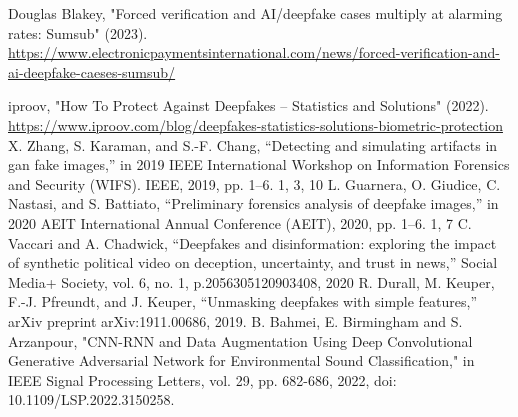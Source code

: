 \begin{thebibliography}{99}
    
     Douglas Blakey, "Forced verification and AI/deepfake cases multiply at alarming rates: Sumsub" (2023). \url{https://www.electronicpaymentsinternational.com/news/forced-verification-and-ai-deepfake-caeses-sumsub/}

    
     iproov, "How To Protect Against Deepfakes – Statistics and Solutions" (2022). \url{https://www.iproov.com/blog/deepfakes-statistics-solutions-biometric-protection}
     X. Zhang, S. Karaman, and S.-F. Chang, “Detecting and simulating artifacts in gan fake images,” in 2019 IEEE International Workshop on Information Forensics and Security (WIFS). IEEE, 2019, pp. 1–6. 1, 3, 10
      L. Guarnera, O. Giudice, C. Nastasi, and S. Battiato, “Preliminary forensics analysis of deepfake images,” in 2020 AEIT International Annual Conference (AEIT), 2020, pp. 1–6. 1, 7
     C. Vaccari and A. Chadwick, “Deepfakes and disinformation: exploring the impact of synthetic political video on deception, uncertainty, and trust in news,” Social Media+ Society, vol. 6, no. 1, p.2056305120903408, 2020
    R. Durall, M. Keuper, F.-J. Pfreundt, and J. Keuper, “Unmasking deepfakes with simple features,” arXiv preprint arXiv:1911.00686, 2019.
    B. Bahmei, E. Birmingham and S. Arzanpour, "CNN-RNN and Data Augmentation Using Deep Convolutional Generative Adversarial Network for Environmental Sound Classification," in IEEE Signal Processing Letters, vol. 29, pp. 682-686, 2022, doi: 10.1109/LSP.2022.3150258.


\end{thebibliography}
